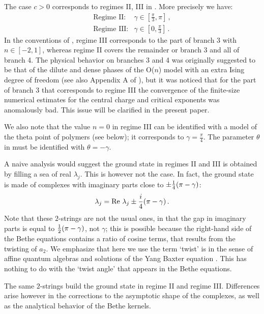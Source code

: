 \documentclass[11pt]{article}
\begin{document}
The case $c>0$ corresponds to regimes II, III in \cite{Nienhuis}. More precisely we have:
%
\begin{eqnarray}
 \mbox{Regime II}: & \gamma \in [\frac{\pi}{3},\pi] \,, \nonumber \\
 \mbox{Regime III}: & \gamma \in [0,\frac{\pi}{3}] \,.
 \label{regimes23}
\end{eqnarray}
%
In the conventions of \cite{BloteNienhuis89}, regime III corresponds to the part of branch 3 with $n \in [-2,1]$, whereas regime II covers the remainder or branch 3 and all of branch 4. The physical behavior on branches 3 and 4 was originally suggested \cite{BloteNienhuis89} to be that of the dilute and dense phases of the O($n$) model with an extra Ising degree of freedom (see also Appendix A of \cite{JacobsenKondev}), but it was noticed \cite{BloteNienhuis89} that for the part of branch 3 that corresponds to regime III the convergence of the finite-size numerical estimates for the central charge and critical exponents was anomalously bad. This issue will be clarified in the present paper.

We also note that the value $n=0$ in regime III can be identified with a model of the theta point of polymers (see below); it corresponds to $\gamma = \frac{\pi}{4}$.
The parameter $\theta$ in \cite{Nienhuis} must be identified with $\theta=-\gamma$. 

A naive analysis would suggest the ground state in regimes II and III is obtained by filling a sea of real $\lambda_j$. This is however not the case. In fact, the ground state is made of complexes with imaginary parts close to $\pm {1\over 4}(\pi-\gamma)$:
%
\begin{equation}
\lambda_j=\hbox{Re }\lambda_j\pm {i\over 4}(\pi-\gamma) \,.
\end{equation}
%
Note that these $2$-strings are not the usual ones, in that the gap in imaginary parts is equal to ${1\over 2}(\pi-\gamma)$, not $\gamma$; this is possible because the right-hand side of the Bethe equations contains a ratio of cosine terms, that results from the twisting of $a_2$. We emphasize that here we use  the term `twist' is  in the sense of affine quantum algebras and solutions of the Yang Baxter equation \cite{Braden}. This has nothing to do with the `twist angle' that appears in the Bethe equations. 

The same $2$-strings build the ground state in regime II and regime III. Differences arise however in the corrections to the asymptotic shape of the complexes, as well as the  analytical behavior of the Bethe kernels.
\end{document}
